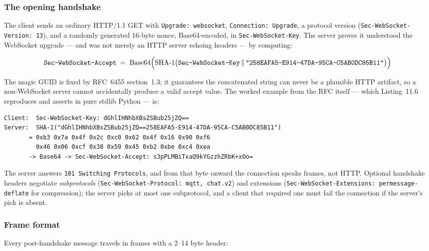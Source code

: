 \subsubsection{The opening handshake}

The client sends an ordinary HTTP/1.1 GET with \texttt{Upgrade: websocket},
\texttt{Connection: Upgrade}, a protocol version (\texttt{Sec-WebSocket-
Version: 13}), and a randomly generated 16-byte nonce, Base64-encoded, in
\texttt{Sec-WebSocket-Key}. The server proves it understood the WebSocket
upgrade --- and was not merely an HTTP server echoing headers --- by
computing:

\begin{equation}
  \texttt{Sec-WebSocket-Accept} \;=\;
  \operatorname{Base64}\Bigl(\operatorname{SHA\text{-}1}\bigl(\texttt{Sec-WebSocket-Key} \,\|\, \texttt{"258EAFA5-E914-47DA-95CA-C5AB0DC85B11"}\bigr)\Bigr)
  \label{eq:ch11-ws-accept}
\end{equation}

The magic GUID is fixed by RFC~6455 section~1.3; it guarantees the
concatenated string can never be a plausible HTTP artifact, so a
non-WebSocket server cannot accidentally produce a valid accept value. The
worked example from the RFC itself --- which Listing~11.6
reproduces and asserts in pure stdlib Python --- is:

\begin{verbatim}
Client:  Sec-WebSocket-Key: dGhlIHNhbXBsZSBub25jZQ==
Server:  SHA-1("dGhlIHNhbXBsZSBub25jZQ==258EAFA5-E914-47DA-95CA-C5AB0DC85B11")
       = 0xb3 0x7a 0x4f 0x2c 0xc0 0x62 0x4f 0x16 0x90 0xf6
         0x46 0x06 0xcf 0x38 0x59 0x45 0xb2 0xbe 0xc4 0xea
       -> Base64 -> Sec-WebSocket-Accept: s3pPLMBiTxaQ9kYGzzhZRbK+xOo=
\end{verbatim}

The server answers \texttt{101 Switching Protocols}, and from that byte
onward the connection speaks frames, not HTTP. Optional handshake headers
negotiate \emph{subprotocols} (\texttt{Sec-WebSocket-Protocol:
mqtt, chat.v2}) and extensions (\texttt{Sec-WebSocket-Extensions:
permessage-deflate} for compression); the server picks at most one
subprotocol, and a client that required one must fail the connection if the
server's pick is absent.

\subsubsection{Frame format}

Every post-handshake message travels in frames with a 2--14 byte header:

